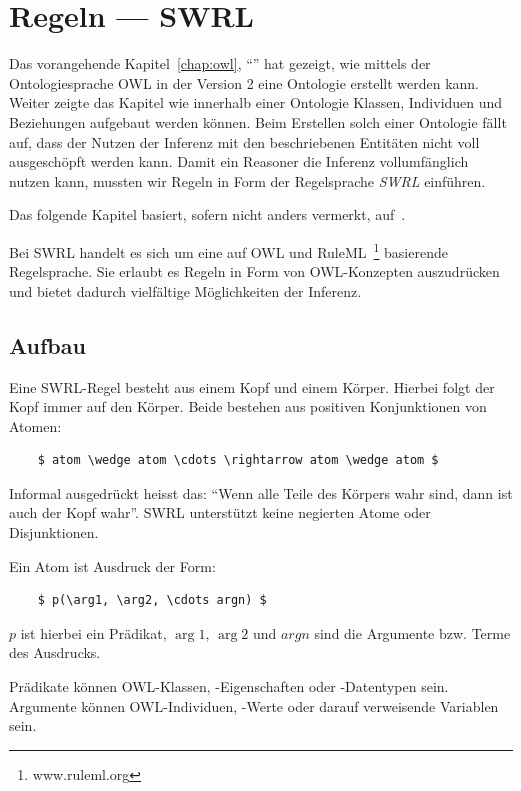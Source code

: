 \chapter{Regeln --- SWRL}
\label{chap:swrl}

Das vorangehende Kapitel~\ref{chap:owl}, ``'' hat gezeigt, wie mittels der Ontologiesprache OWL in der Version 2 eine Ontologie erstellt werden kann. Weiter zeigte das Kapitel wie innerhalb einer Ontologie Klassen, Individuen und Beziehungen aufgebaut werden können. Beim Erstellen solch einer Ontologie fällt auf, dass der Nutzen der Inferenz mit den beschriebenen Entitäten nicht voll ausgeschöpft werden kann. Damit ein Reasoner die Inferenz vollumfänglich nutzen kann, mussten wir Regeln in Form der Regelsprache \textit{SWRL} einführen.

Das folgende Kapitel basiert, sofern nicht anders vermerkt, auf~\cite{swrl}.

Bei SWRL handelt es sich um eine auf OWL und RuleML~\footnote{www.ruleml.org} basierende Regelsprache. Sie erlaubt es Regeln in Form von OWL-Konzepten auszudrücken und bietet dadurch vielfältige Möglichkeiten der Inferenz.

\section{Aufbau}
\label{sec:swrl_aufbau}
Eine SWRL-Regel besteht aus einem Kopf und einem Körper. Hierbei folgt der Kopf immer auf den Körper. Beide bestehen aus positiven Konjunktionen von Atomen:
\lstset{language=XML}
\begin{lstlisting}
    $ atom \wedge atom \cdots \rightarrow atom \wedge atom $
\end{lstlisting}

Informal ausgedrückt heisst das: ``Wenn alle Teile des Körpers wahr sind, dann ist auch der Kopf wahr''. SWRL unterstützt keine negierten Atome oder Disjunktionen.

Ein Atom ist Ausdruck der Form:
\lstset{language=XML}
\begin{lstlisting}
    $ p(\arg1, \arg2, \cdots argn) $
\end{lstlisting}
$p$ ist hierbei ein Prädikat, $\arg1$, $\arg2$ und $argn$ sind die Argumente bzw. Terme des Ausdrucks.

Prädikate können OWL-Klassen, -Eigenschaften oder -Datentypen sein. Argumente können OWL-Individuen, -Werte oder darauf verweisende Variablen sein.

